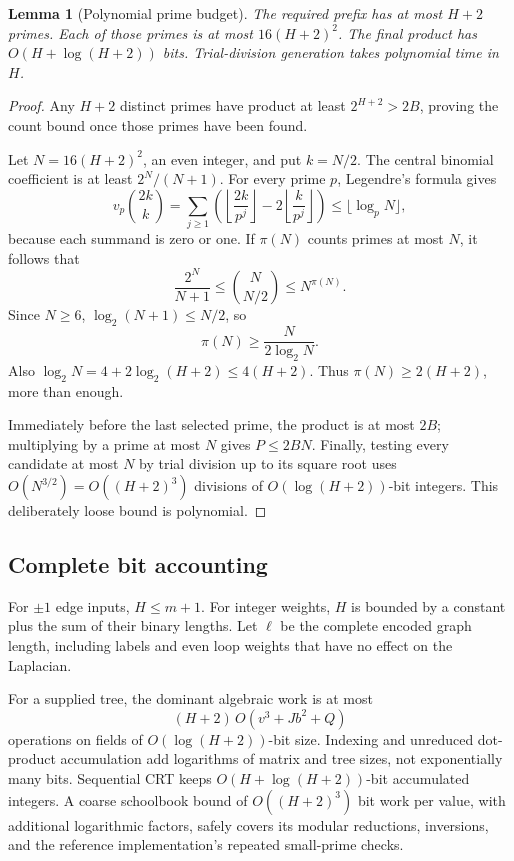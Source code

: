 \documentclass[11pt,letterpaper]{article}
\newtheorem{lemma}[theorem]{Lemma}
\theoremstyle{definition}\newtheorem{definition}[theorem]{Definition}
\theoremstyle{remark}\newtheorem{remark}[theorem]{Remark}
\begin{document}
\begin{lemma}[Polynomial prime budget]
\label{lem:prime}
The required prefix has at most $H+2$ primes. Each of those primes is at most $16(H+2)^2$. The final product has $O(H+\log(H+2))$ bits. Trial-division generation takes polynomial time in $H$.
\end{lemma}
\begin{proof}
Any $H+2$ distinct primes have product at least $2^{H+2}>2B$, proving the count bound once those primes have been found.

Let $N=16(H+2)^2$, an even integer, and put $k=N/2$. The central binomial coefficient is at least $2^N/(N+1)$. For every prime $p$, Legendre's formula gives
\[
 v_p\binom{2k}{k}
 =\sum_{j\geq1}\left(\left\lfloor\frac{2k}{p^j}\right\rfloor
                    -2\left\lfloor\frac{k}{p^j}\right\rfloor\right)
 \leq\lfloor\log_p N\rfloor,
\]
because each summand is zero or one. If $\pi(N)$ counts primes at most $N$, it follows that
\[
 \frac{2^N}{N+1}\leq\binom{N}{N/2}\leq N^{\pi(N)}.
\]
Since $N\geq6$, $\log_2(N+1)\leq N/2$, so
\[
 \pi(N)\geq\frac{N}{2\log_2N}.
\]
Also $\log_2N=4+2\log_2(H+2)\leq4(H+2)$. Thus $\pi(N)\geq2(H+2)$, more than enough.

Immediately before the last selected prime, the product is at most $2B$; multiplying by a prime at most $N$ gives $P\leq2BN$. Finally, testing every candidate at most $N$ by trial division up to its square root uses $O(N^{3/2})=O((H+2)^3)$ divisions of $O(\log(H+2))$-bit integers. This deliberately loose bound is polynomial.
\end{proof}

\subsection{Complete bit accounting}
For $\pm1$ edge inputs, $H\leq m+1$. For integer weights, $H$ is bounded by a constant plus the sum of their binary lengths. Let $\ell$ be the complete encoded graph length, including labels and even loop weights that have no effect on the Laplacian.

For a supplied tree, the dominant algebraic work is at most
\begin{equation}
 (H+2)\,O(v^3+Jb^2+Q)
 \label{eq:exactfield}
\end{equation}
operations on fields of $O(\log(H+2))$-bit size. Indexing and unreduced dot-product accumulation add logarithms of matrix and tree sizes, not exponentially many bits. Sequential CRT keeps $O(H+\log(H+2))$-bit accumulated integers. A coarse schoolbook bound of $O((H+2)^3)$ bit work per value, with additional logarithmic factors, safely covers its modular reductions, inversions, and the reference implementation's repeated small-prime checks.
\end{document}
